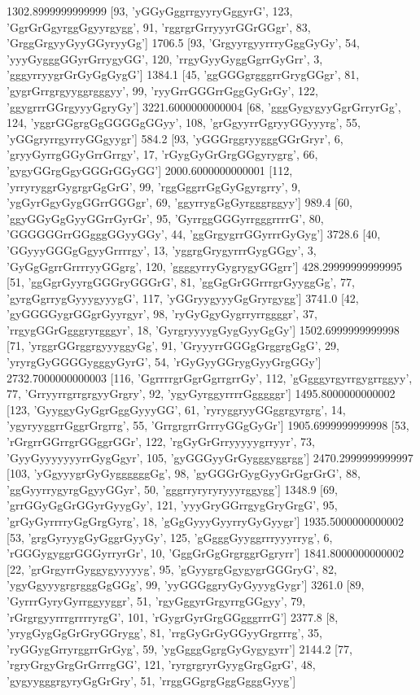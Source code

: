 1302.8999999999999 [93, 'yGGyGggrrgyyryGggyrG', 123, 'GgrGrGgyrggGgyyrgygg', 91, 'rggrgrGrryyyrGGrGGgr', 83, 'GrggGrgyyGyyGGyryyGg']
1706.5 [93, 'GrgyyrgyyrrryGggGyGy', 54, 'yyyGygggGGyrGrrygyGG', 120, 'rrgyGyyGyggGgrrGyGrr', 3, 'gggyrryygrGrGyGgGygG']
1384.1 [45, 'ggGGGgrgggrrGrygGGgr', 81, 'gygrGrrgrgyyggrgggyy', 99, 'ryyGrrGGGrrGggGyGrGy', 122, 'ggygrrrGGrgyyyGgryGy']
3221.6000000000004 [68, 'gggGygygyyGgrGrryrGg', 124, 'yggrGGgrgGgGGGGgGGyy', 108, 'grGgyyrrGgryyGGyyyrg', 55, 'yGGgryrrgyrryGGgyygr']
584.2 [93, 'yGGGrggryygggGGrGryr', 6, 'gryyGyrrgGGyGrrGrrgy', 17, 'rGygGyGrGrgGGgyrygrg', 66, 'gygyGGrgGgyGGGrGGyGG']
2000.6000000000001 [112, 'yrryryggrGygrgrGgGrG', 99, 'rggGggrrGgGyGgyrgrry', 9, 'ygGyrGgyGygGGrrGGGgr', 69, 'ggyrrygGgGyrgggrggyy']
989.4 [60, 'ggyGGyGgGyyGGrrGyrGr', 95, 'GyrrggGGGyrrgggrrrrG', 80, 'GGGGGGrrGGgggGGyyGGy', 44, 'ggGrgygrrGGyrrrGyGyg']
3728.6 [40, 'GGyyyGGGgGgyyGrrrrgy', 13, 'yggrgGrygyrrrGygGGgy', 3, 'GyGgGgrrGrrrryyGGgrg', 120, 'ggggyrryGygrygyGGgrr']
428.29999999999995 [51, 'ggGgrGyyrgGGGryGGGrG', 81, 'ggGgGrGGrrrgrGyyggGg', 77, 'gyrgGgrrygGyyygyyygG', 117, 'yGGryygyyyGgGryrgygg']
3741.0 [42, 'gyGGGGygrGGgrGyyrgyr', 98, 'ryGyGgyGygrryrrggggr', 37, 'rrgygGGrGgggryrgggyr', 18, 'GyrgryyyygGygGyyGgGy']
1502.6999999999998 [71, 'yrggrGGrggrgyyyggyGg', 91, 'GryyyrrGGGgGrggrgGgG', 29, 'yryrgGyGGGGygggyGyrG', 54, 'rGyGyyGGrygGyyGrgGGy']
2732.7000000000003 [116, 'GgrrrrgrGgrGgrrgrrGy', 112, 'gGgggyrgyrrgygrrggyy', 77, 'GrryyrrgrrgrgyyGrgry', 92, 'ygyGyrggyrrrrGgggggr']
1495.8000000000002 [123, 'GyyggyGyGgrGggGyyyGG', 61, 'ryryggryyGGggrgyrgrg', 14, 'ygyryyggrrGggrGrgrrg', 55, 'GrrgrgrrGrrryGGgGyGr']
1905.6999999999998 [53, 'rGrgrrGGrrgrGGggrGGr', 122, 'rgGyGrGrryyyyygrryyr', 73, 'GyyGyyyyyyyrrGygGgyr', 105, 'gyGGGyyGrGygggyggrgg']
2470.2999999999997 [103, 'yGgyyygrGyGyggggggGg', 98, 'gyGGGrGygGyyGrGgrGrG', 88, 'ggGyyrrygyrgGgyyGGyr', 50, 'gggrryryryryyyrggygg']
1348.9 [69, 'grrGGyGgGrGGyrGyygGy', 121, 'yyyGryGGrrgygGryGrgG', 95, 'grGyGyrrrryGgGrgGyrg', 18, 'gGgGyyyGyyrryGyGyygr']
1935.5000000000002 [53, 'grgGyryygGyGggrGyyGy', 125, 'gGgggGyyggrrryyyrryg', 6, 'rGGGygyggrGGGyrryrGr', 10, 'GggGrGgGrgrggrGgryrr']
1841.8000000000002 [22, 'grGrgyrrGyggygyyyyyg', 95, 'gGyygrgGgygygrGGGryG', 82, 'ygyGgyyygrgrgggGgGGg', 99, 'yyGGGggryGyGyyygGygr']
3261.0 [89, 'GyrrrGyryGyrrggyyggr', 51, 'rgyGggyrGrgyrrgGGgyy', 79, 'rGrgrgyyrrrgrrrryrgG', 101, 'rGygrGyrGrgGGgggrrrG']
2377.8 [8, 'yrygGygGgGrGryGGrygg', 81, 'rrgGyGrGyGGyyGrgrrrg', 35, 'ryGGygGrryrggrrGrGyg', 59, 'ygGgggGgrgGyGygygyrr']
2144.2 [77, 'rgryGrgyGrgGrGrrrgGG', 121, 'ryrgrgryrGyygGrgGgrG', 48, 'gygyygggrgyryGgGrGry', 51, 'rrggGGgrgGggGgggGyyg']

